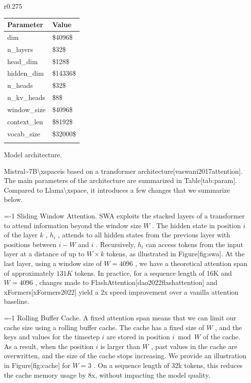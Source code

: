 \documentclass[11pt,a4paper]{article}
\begin{document}
r0.275

\begin{table}[h]
\begin{tabular}{|l|l|}
\hline
Parameter & Value \\ \hline
dim & \$4096\$ \\ \hline
n\_layers & \$32\$ \\ \hline
head\_dim & \$128\$ \\ \hline
hidden\_dim & \$14336\$ \\ \hline
n\_heads & \$32\$ \\ \hline
n\_kv\_heads & \$8\$ \\ \hline
window\_size & \$4096\$ \\ \hline
context\_len & \$8192\$ \\ \hline
vocab\_size & \$32000\$ \\ \hline
 &  \\ \hline
\end{tabular}
\end{table}

Model architecture.

Mistral\textasciitilde{}7B\textbackslash{}xspaceis based on a transformer architecture[vaswani2017attention]. The main parameters of the architecture are summarized in Table[tab:param]. Compared to Llama\textbackslash{}xspace, it introduces a few changes that we summarize below.

=-1 Sliding Window Attention. SWA exploits the stacked layers of a transformer to attend information beyond the window size  $W$ . The hidden state in position  $i$  of the layer  $k$ ,  $h_i$ , attends to all hidden states from the previous layer with positions between  $i-W$  and  $i$ . Recursively,  $h_i$  can access tokens from the input layer at a distance of up to  $W \times k$  tokens, as illustrated in Figure[fig:swa]. At the last layer, using a window size of  $W=4096$ , we have a theoretical attention span of approximately  $131K$  tokens. In practice, for a sequence length of 16K and  $W=4096$ , changes made to FlashAttention[dao2022flashattention] and xFormers[xFormers2022] yield a 2x speed improvement over a vanilla attention baseline.

=-1 Rolling Buffer Cache. A fixed attention span means that we can limit our cache size using a rolling buffer cache. The cache has a fixed size of  $W$ , and the keys and values for the timestep  $i$  are stored in position  $i \bmod W$  of the cache. As a result, when the position  $i$  is larger than  $W$ , past values in the cache are overwritten, and the size of the cache stops increasing. We provide an illustration in Figure[fig:cache] for  $W=3$ . On a sequence length of 32k tokens, this reduces the cache memory usage by 8x, without impacting the model quality.
\end{document}
